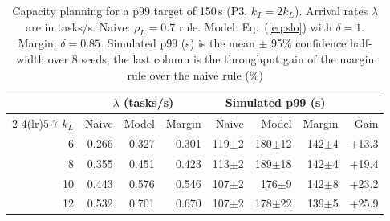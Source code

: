 \documentclass[journal]{IEEEtran}
\begin{document}
\begin{table}[t]
\caption{Capacity planning for a p99 target of 150\,s (P3, $k_T=2k_L$). Arrival rates $\lambda$ are in tasks/s. Naive: $\rho_L=0.7$ rule. Model: Eq.~(\ref{eq:slo}) with $\delta=1$. Margin: $\delta=0.85$. Simulated p99 (s) is the mean $\pm$ 95\% confidence half-width over 8 seeds; the last column is the throughput gain of the margin rule over the naive rule (\%)}
\label{tab:slo}
\centering
\footnotesize
\setlength{\tabcolsep}{2.5pt}
\begin{tabular}{rrrrrrrr}
\toprule
 & \multicolumn{3}{c}{$\lambda$ (tasks/s)} & \multicolumn{3}{c}{Simulated p99 (s)} & \\
\cmidrule(lr){2-4}\cmidrule(lr){5-7}
$k_L$ & Naive & Model & Margin & Naive & Model & Margin & Gain \\
\midrule
6 & 0.266 & 0.327 & 0.301 & 119$\pm$2 & 180$\pm$12 & 142$\pm$4 & +13.3 \\
8 & 0.355 & 0.451 & 0.423 & 113$\pm$2 & 189$\pm$18 & 142$\pm$4 & +19.4 \\
10 & 0.443 & 0.576 & 0.546 & 107$\pm$2 & 176$\pm$9 & 142$\pm$8 & +23.2 \\
12 & 0.532 & 0.701 & 0.670 & 107$\pm$2 & 178$\pm$22 & 139$\pm$5 & +25.9 \\
\bottomrule
\end{tabular}
\end{table}
\end{document}
